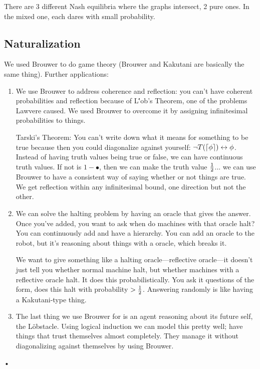 \documentclass[11pt]{article}
\begin{document}
There are 3 different Nash equilibria where the graphs intersect, 2 pure ones. In the mixed one, each dares with small probability.

\subsection{Naturalization}


We used Brouwer to do game theory (Brouwer and Kakutani are basically the same thing). Further applications:
\begin{enumerate}
\item
We use Brouwer to address coherence and reflection: you can't have coherent probabilities and reflection because of L\''ob's Theorem, one of the problems Lawvere caused. We used Brouwer to overcome it by assigning infinitesimal probabilities to things.

Tarski's Theorem: You can't write down what it means for something to be true because then you could diagonalize against yourself: $\neg T(\left\lceil {\phi}\right\rceil) \leftrightarrow \phi$. 
Instead of having truth values being true or false, we can have continuous truth values. If not is $1-\bullet$, then we can make the truth value $\frac{1}{2}$... we can use Brouwer to have a consistent way of saying whether or not things are true. We get reflection within any infinitesimal bound, one direction but not the other.
\item
We can solve the halting problem by having an oracle that gives the answer. Once you've added, you want to ask when do machines with that oracle halt? You can continuously add and have a hierarchy. You can add an oracle to the robot, but it's reasoning about things with a oracle, which breaks it.

We want to give something like a halting oracle---reflective oracle---it doesn't just tell you whether normal machine halt, but whether machines with a reflective oracle halt. It does this probabilistically. You ask it questions of the form, does this halt with probability $>\frac{1}{2}$. Answering randomly is like having a Kakutani-type thing. 
\item
The last thing we use Brouwer for is an agent reasoning about its future self, the L\"obstacle. Using logical induction we can model this pretty well; have things that trust themselves almost completely. They manage it without diagonalizing against themselves by using Brouwer.

\end{enumerate}•
\end{document}
